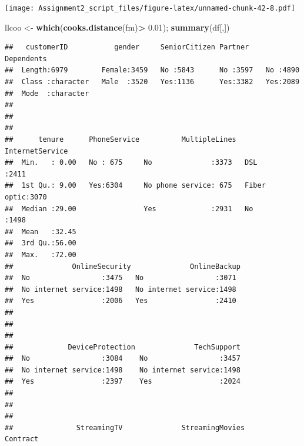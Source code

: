 \documentclass[
]{article}
\newenvironment{Shaded}{\begin{snugshade}}{\end{snugshade}}
\newcommand{\FloatTok}[1]{\textcolor[rgb]{0.00,0.00,0.81}{#1}}
\newcommand{\FunctionTok}[1]{\textcolor[rgb]{0.13,0.29,0.53}{\textbf{#1}}}
\newcommand{\NormalTok}[1]{#1}
\newcommand{\OtherTok}[1]{\textcolor[rgb]{0.56,0.35,0.01}{#1}}
\newcommand{\SpecialCharTok}[1]{\textcolor[rgb]{0.81,0.36,0.00}{\textbf{#1}}}
\begin{document}
\texttt{[image: Assignment2\_script\_files/figure-latex/unnamed-chunk-42-8.pdf]}

\begin{Shaded}
\begin{Highlighting}[]
\NormalTok{llcoo }\OtherTok{\textless{}{-}} \FunctionTok{which}\NormalTok{(}\FunctionTok{cooks.distance}\NormalTok{(fm)}\SpecialCharTok{\textgreater{}} \FloatTok{0.01}\NormalTok{);}
\FunctionTok{summary}\NormalTok{(df[,])}
\end{Highlighting}
\end{Shaded}

\begin{verbatim}
##   customerID           gender     SeniorCitizen Partner    Dependents
##  Length:6979        Female:3459   No :5843      No :3597   No :4890  
##  Class :character   Male  :3520   Yes:1136      Yes:3382   Yes:2089  
##  Mode  :character                                                    
##                                                                      
##                                                                      
##                                                                      
##      tenure      PhoneService          MultipleLines     InternetService
##  Min.   : 0.00   No : 675     No              :3373   DSL        :2411  
##  1st Qu.: 9.00   Yes:6304     No phone service: 675   Fiber optic:3070  
##  Median :29.00                Yes             :2931   No         :1498  
##  Mean   :32.45                                                          
##  3rd Qu.:56.00                                                          
##  Max.   :72.00                                                          
##              OnlineSecurity              OnlineBackup 
##  No                 :3475   No                 :3071  
##  No internet service:1498   No internet service:1498  
##  Yes                :2006   Yes                :2410  
##                                                       
##                                                       
##                                                       
##             DeviceProtection              TechSupport  
##  No                 :3084    No                 :3457  
##  No internet service:1498    No internet service:1498  
##  Yes                :2397    Yes                :2024  
##                                                        
##                                                        
##                                                        
##               StreamingTV              StreamingMovies           Contract   

\end{verbatim}
\end{document}
